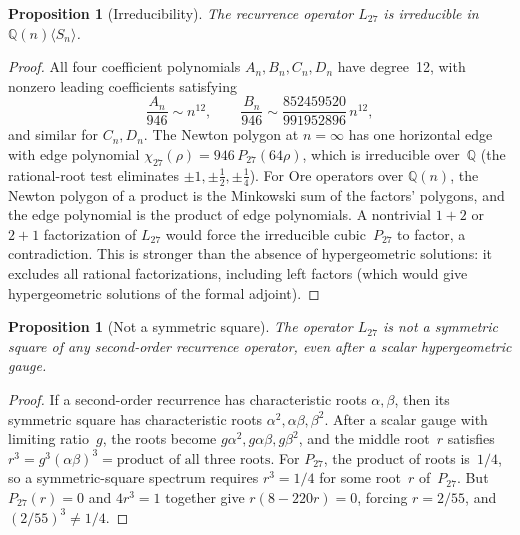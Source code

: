 \documentclass[11pt]{article}
\newtheorem{proposition}[theorem]{Proposition}
\theoremstyle{remark}
\begin{document}
\begin{proposition}[Irreducibility]\label{prop:irred}
The recurrence operator $L_{27}$ is irreducible
in~$\mathbb{Q}(n)\langle S_n\rangle$.
\end{proposition}
\begin{proof}
All four coefficient polynomials $A_n, B_n, C_n, D_n$ have
degree~12, with nonzero leading coefficients satisfying
\[
\frac{A_n}{946} \sim n^{12}, \qquad
\frac{B_n}{946} \sim \frac{852459520}{991952896}\,n^{12},
\]
and similar for $C_n, D_n$. The Newton polygon at
$n = \infty$ has one horizontal edge with edge polynomial
$\chi_{27}(\rho) = 946\,P_{27}(64\rho)$,
which is irreducible over~$\mathbb{Q}$ (the rational-root
test eliminates $\pm 1, \pm\tfrac{1}{2}, \pm\tfrac{1}{4}$).
For Ore operators over $\mathbb{Q}(n)$, the Newton polygon of
a product is the Minkowski sum of the factors' polygons, and
the edge polynomial is the product of edge polynomials. A
nontrivial $1+2$ or $2+1$ factorization of $L_{27}$ would
force the irreducible cubic~$P_{27}$ to factor, a
contradiction. This is stronger than the absence of
hypergeometric solutions: it excludes all rational
factorizations, including left factors (which would give
hypergeometric solutions of the formal adjoint).
\end{proof}

\begin{proposition}[Not a symmetric square]\label{prop:notsymsq}
The operator $L_{27}$ is not a symmetric square of any
second-order recurrence operator, even after a scalar
hypergeometric gauge.
\end{proposition}
\begin{proof}
If a second-order recurrence has characteristic roots
$\alpha, \beta$, then its symmetric square has
characteristic roots $\alpha^2, \alpha\beta, \beta^2$.
After a scalar gauge with limiting ratio~$g$, the roots
become $g\alpha^2, g\alpha\beta, g\beta^2$, and the middle
root~$r$ satisfies $r^3 = g^3(\alpha\beta)^3 =
\text{product of all three roots}$. For $P_{27}$, the
product of roots is~$1/4$, so a symmetric-square spectrum
requires $r^3 = 1/4$ for some root~$r$ of~$P_{27}$. But
$P_{27}(r) = 0$ and $4r^3 = 1$ together give
$r(8 - 220r) = 0$, forcing $r = 2/55$, and
$(2/55)^3 \neq 1/4$.
\end{proof}
\end{document}
